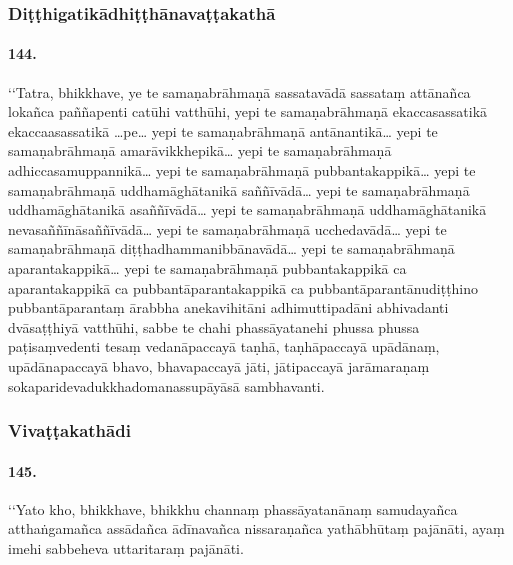 \subsubsection{Diṭṭhigatikādhiṭṭhānavaṭṭakathā}

\paragraph{144.}
‘‘Tatra, bhikkhave, ye te samaṇabrāhmaṇā sassatavādā sassataṃ attānañca lokañca paññapenti catūhi vatthūhi, yepi te samaṇabrāhmaṇā ekaccasassatikā ekaccaasassatikā …pe… yepi te samaṇabrāhmaṇā antānantikā… yepi te samaṇabrāhmaṇā amarāvikkhepikā… yepi te samaṇabrāhmaṇā adhiccasamuppannikā… yepi te samaṇabrāhmaṇā pubbantakappikā… yepi te samaṇabrāhmaṇā uddhamāghātanikā saññīvādā… yepi te samaṇabrāhmaṇā uddhamāghātanikā asaññīvādā… yepi te samaṇabrāhmaṇā uddhamāghātanikā nevasaññīnāsaññīvādā… yepi te samaṇabrāhmaṇā ucchedavādā… yepi te samaṇabrāhmaṇā diṭṭhadhammanibbānavādā… yepi te samaṇabrāhmaṇā aparantakappikā… yepi te samaṇabrāhmaṇā pubbantakappikā ca aparantakappikā ca pubbantāparantakappikā ca pubbantāparantānudiṭṭhino pubbantāparantaṃ ārabbha anekavihitāni adhimuttipadāni abhivadanti dvāsaṭṭhiyā vatthūhi, sabbe te chahi phassāyatanehi phussa phussa paṭisaṃvedenti tesaṃ vedanāpaccayā taṇhā, taṇhāpaccayā upādānaṃ, upādānapaccayā bhavo, bhavapaccayā jāti, jātipaccayā jarāmaraṇaṃ sokaparidevadukkhadomanassupāyāsā sambhavanti.

\subsubsection{Vivaṭṭakathādi}

\paragraph{145.}
‘‘Yato kho, bhikkhave, bhikkhu channaṃ phassāyatanānaṃ samudayañca atthaṅgamañca assādañca ādīnavañca nissaraṇañca yathābhūtaṃ pajānāti, ayaṃ imehi sabbeheva uttaritaraṃ pajānāti.

